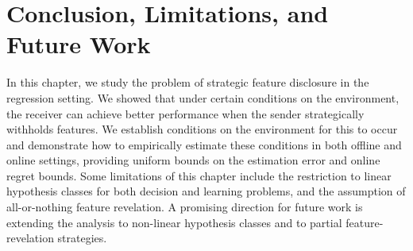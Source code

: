 \section{Conclusion, Limitations, and Future Work}

In this chapter, we study the problem of strategic feature disclosure in the regression setting. 
We showed that under certain conditions on the environment, the receiver can achieve better performance when the sender strategically withholds features. 
We establish conditions on the environment for this to occur and demonstrate how to empirically estimate these conditions in both offline and online settings, providing uniform bounds on the estimation error and online regret bounds. Some limitations of this chapter include the restriction to linear hypothesis classes for both decision and learning problems, and the assumption of all-or-nothing feature revelation. A promising direction for future work is extending the analysis to non-linear hypothesis classes and to partial feature-revelation strategies.